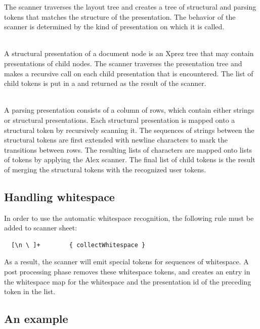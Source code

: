 \documentclass[12pt]{article}
\begin{document}
The scanner traverses the layout tree and creates a tree of structural and parsing tokens that matches the structure of the presentation.  The behavior of the scanner is determined by the kind of presentation on which it is called.


 \\
A structural presentation of a document node is an Xprez tree that may contain presentations of child nodes. The scanner traverses the presentation tree and makes a recursive call on each child presentation that is encountered. The list of child tokens is put in a  and returned as the result of the scanner.

 \\
A parsing presentation consists of a column of rows, which contain either strings or structural presentations. Each structural presentation is mapped onto a structural token by recursively scanning it. The sequences of strings between the structural tokens are first extended with newline characters to mark the transitions between rows. The resulting lists of characters are mapped onto lists of  tokens by applying the Alex scanner. The final list of child tokens is the result of merging the structural tokens with the recognized user tokens.


\subsection{Handling whitespace}

In order to use the automatic whitespace recognition, the following rule must be added to scanner sheet:

\begin{footnotesize}
\begin{verbatim}
  [\n \ ]+        { collectWhitespace }
\end{verbatim} %
\end{footnotesize}

As a result, the scanner will emit special tokens for sequences of whitespace. A post processing phase removes these whitespace tokens, and creates an entry in the whitespace map for the whitespace and the presentation id of the preceding token in the list. 


\subsection{An example}
\end{document}
